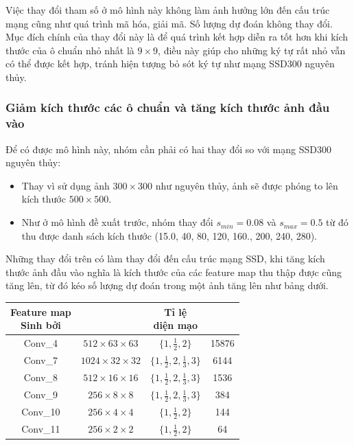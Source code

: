\documentclass[a4paper,12pt]{article}
\begin{document}
	Việc thay đổi tham số ở mô hình này không làm ảnh hưởng lớn đến cấu trúc mạng cũng như quá trình mã hóa, giải mã. Số lượng dự đoán không thay đổi.\\
	
	Mục đích chính của thay đổi này là để quá trình kết hợp diễn ra tốt hơn khi kích thước của ô chuẩn nhỏ nhất là $9 \times 9$, điều này giúp cho những ký tự rất nhỏ vẫn có thể được kết hợp, tránh hiện tượng bỏ sót ký tự như mạng SSD300 nguyên thủy.
	
	\subsubsection*{Giảm kích thước các ô chuẩn và tăng kích thước ảnh đầu vào}
	
	Để có được mô hình này, nhóm cần phải có hai thay đổi so với mạng SSD300 nguyên thủy:
	\begin{itemize}
		\item Thay vì sử dụng ảnh $300 \times 300$ như nguyên thủy, ảnh sẽ được phóng to lên kích thước $500 \times 500$.
		\item Như ở mô hình đề xuất trước, nhóm thay đổi $s_{min} = 0.08$ và $s_{max} = 0.5$ từ đó thu được danh sách kích thước (15.0, 40, 80, 120, 160., 200, 240, 280).
	\end{itemize}
	
	Những thay đổi trên có làm thay đổi đến cấu trúc mạng SSD, khi tăng kích thước ảnh đầu vào nghĩa là kích thước của các feature map thu thập được cũng tăng lên, từ đó kéo số lượng dự đoán trong một ảnh tăng lên như bảng dưới.\\
	
	\begin{center}
		\begin{tabular}{||c | c | c | c ||} 
			\hline
			\makecell{ Feature map \\ Sinh bởi } & \makecell{ Kích thước} & \makecell{Tỉ lệ \\ diện mạo } &  \makecell{ Số dự đoán } \\ [0.5ex] 
			\hline\hline
			Conv\_4 & $512 \times 63 \times 63$ & $ \{ 1, \frac{1}{2} , 2\} $ & 15876 \\ 
			\hline
			Conv\_7 & $1024 \times 32 \times 32$ & $ \{ 1, \frac{1}{2} , 2, \frac{1}{3}, 3\} $ & 6144 \\ 
			\hline
			Conv\_8 & $512 \times 16 \times 16$ &  $ \{ 1, \frac{1}{2} , 2, \frac{1}{3}, 3\} $ & 1536 \\ 
			\hline
			Conv\_9 & $256 \times 8 \times 8 $ &  $ \{ 1, \frac{1}{2} , 2, \frac{1}{3}, 3\} $ & 384  \\ 
			\hline
			Conv\_10 & $256 \times 4 \times 4$ & $ \{ 1, \frac{1}{2} , 2\} $ & 144 \\ 
			\hline
			Conv\_11 & $256 \times 2 \times 2$ & $ \{ 1, \frac{1}{2} , 2\} $ & 64 \\ 
			\hline
		\end{tabular}
	\end{center}
	
\end{document}
